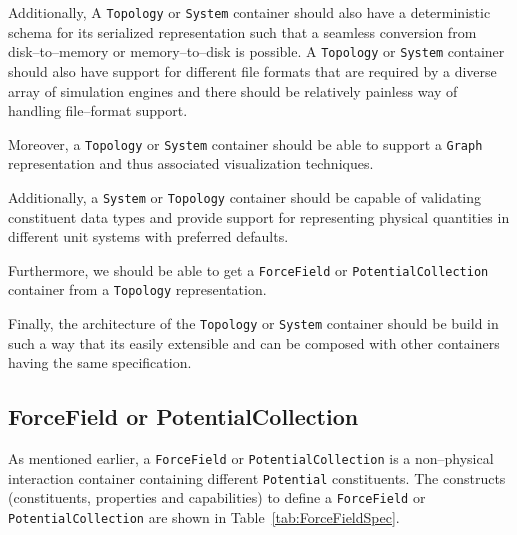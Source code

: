 \documentclass[12pt]{article}
\begin{document}
Additionally, A \texttt{Topology} or \texttt{System} container should also have a deterministic schema for its serialized representation such that a seamless conversion from disk--to--memory or memory--to--disk is possible. A \texttt{Topology} or \texttt{System} container should also have support for different file formats that are required by a diverse array of simulation engines and there should be relatively painless way of handling file--format support.

Moreover, a \texttt{Topology} or \texttt{System} container should be able to support a \texttt{Graph} representation and thus associated visualization techniques.

Additionally, a \texttt{System} or \texttt{Topology} container should be capable of validating constituent data types and provide support for representing physical quantities in different unit systems with preferred defaults.

Furthermore, we should be able to get a \texttt{ForceField} or \texttt{PotentialCollection} container from a \texttt{Topology} representation.

Finally, the architecture of the \texttt{Topology} or \texttt{System} container should be build in such a way that its easily extensible and can be composed with other containers having the same specification.

\subsection{ForceField or PotentialCollection}
\label{def:ForceField}
As mentioned earlier, a \texttt{ForceField} or \texttt{PotentialCollection} is a non--physical interaction container containing different \texttt{Potential} constituents.  The constructs (constituents, properties and capabilities) to define a \texttt{ForceField} or \texttt{PotentialCollection} are shown in  Table~\ref{tab:ForceFieldSpec}.
\end{document}
